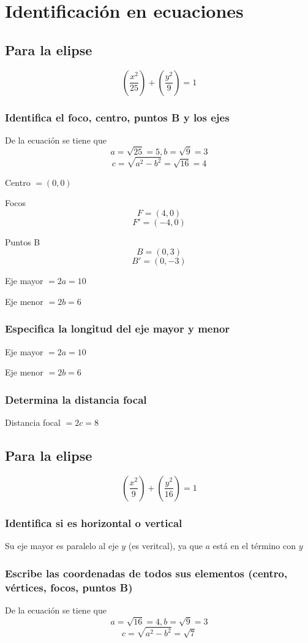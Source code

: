\documentclass{article}
\begin{document}
\section{Identificación en ecuaciones}
\subsection{Para la elipse}
$$(\frac{x^2}{25})+(\frac{y^2}{9})=1$$
\subsubsection{Identifica el foco, centro, puntos B y los ejes}
De la ecuación se tiene que 
$$a=\sqrt{25}=5 , b=\sqrt{9}=3$$
$$c=\sqrt{a^2-b^2}=\sqrt{16}=4$$

Centro $=(0,0)$

Focos $$F=(4,0)$$ $$F'=(-4,0)$$

Puntos B $$B=(0,3)$$ $$B'=(0,-3)$$

Eje mayor $=2a=10$

Eje menor $=2b=6$
\subsubsection{Especifica la longitud del eje mayor y menor}

Eje mayor $=2a=10$

Eje menor $=2b=6$
\subsubsection{Determina la distancia focal}
Distancia focal $=2c=8$

\subsection{Para la elipse}
$$(\frac{x^2}{9})+(\frac{y^2}{16})=1$$
\subsubsection{Identifica si es horizontal o vertical}
Su eje mayor es paralelo al eje $y$ (es veritcal), ya que $a$ está en el término con $y$
\subsubsection{Escribe las coordenadas de todos sus elementos (centro, vértices, focos, puntos B)}
De la ecuación se tiene que 
$$a=\sqrt{16}=4 , b=\sqrt{9}=3$$
$$c=\sqrt{a^2-b^2}=\sqrt{7}$$
\end{document}
